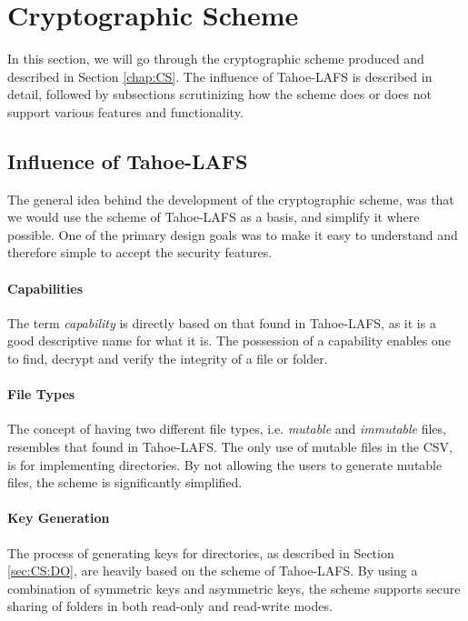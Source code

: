 \documentclass[pdftex,english,10pt,b5paper,twoside]{book}
\begin{document}

\section{Cryptographic Scheme}

In this section, we will go through the cryptographic scheme produced and
described in Section \ref{chap:CS}. The influence of Tahoe-\ac{LAFS} is
described in detail, followed by subsections scrutinizing how the scheme does
or does not support various features and functionality.

\subsection{Influence of Tahoe-LAFS}

The general idea behind the development of the cryptographic scheme, was that
we would use the scheme of Tahoe-\ac{LAFS} as a basis, and simplify it where
possible. One of the primary design goals was to make it easy to
understand and therefore simple to accept the security features.

\paragraph{Capabilities} The term \emph{capability} is directly based on that
found in Tahoe-\ac{LAFS}, as it is a good descriptive name for what it is. The
possession of a capability enables one to find, decrypt and verify the
integrity of a file or folder.

\paragraph{File Types} The concept of having two different file types, i.e.
\emph{mutable} and \emph{immutable} files, resembles that found in
Tahoe-\ac{LAFS}. The only use of mutable files in the \acl{CSV}, is for
implementing directories. By not allowing the users to generate mutable files,
the scheme is significantly simplified.

\paragraph{Key Generation} The process of generating keys for directories, as
described in Section \ref{sec:CS:DO}, are heavily based on the scheme of
Tahoe-\ac{LAFS}. By using a combination of symmetric keys and asymmetric keys,
the scheme supports secure sharing of folders in both read-only and read-write
modes.
\end{document}
